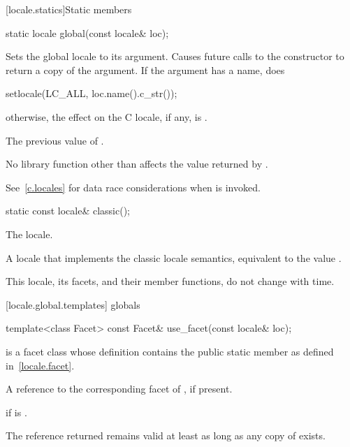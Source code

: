 [locale.statics]{Static members}

%
\begin{itemdecl}
static locale global(const locale& loc);
\end{itemdecl}

\begin{itemdescr}
\pnum
\effects
Sets the global locale to its argument.
Causes future calls to the constructor
to return a copy of the argument.
If the argument has a name, does
\begin{codeblock}
setlocale(LC_ALL, loc.name().c_str());
\end{codeblock}
otherwise, the effect on the C locale, if any, is .

\pnum
\returns
The previous value of
.

\pnum
\remarks
No library function other than
affects the value returned by
.
\begin{note}
See~\ref{c.locales} for data race considerations when
 is invoked.
\end{note}
\end{itemdescr}

%
\begin{itemdecl}
static const locale& classic();
\end{itemdecl}

\begin{itemdescr}
\pnum
The  locale.

\pnum
\returns
A locale that implements the classic  locale semantics, equivalent
to the value .

\pnum
\remarks
This locale, its facets, and their member functions, do not change
with time.
\end{itemdescr}

[locale.global.templates]{ globals}

%
\begin{itemdecl}
template<class Facet> const Facet& use_facet(const locale& loc);
\end{itemdecl}

\begin{itemdescr}
\pnum
\mandates
{}
is a facet class whose definition contains the public static member
as defined in~\ref{locale.facet}.

\pnum
\returns
A reference to the corresponding facet of , if present.

\pnum
\throws
{}
if
is
.

\pnum
\remarks
The reference returned remains valid at least as long as any copy of
 exists.
\end{itemdescr}


